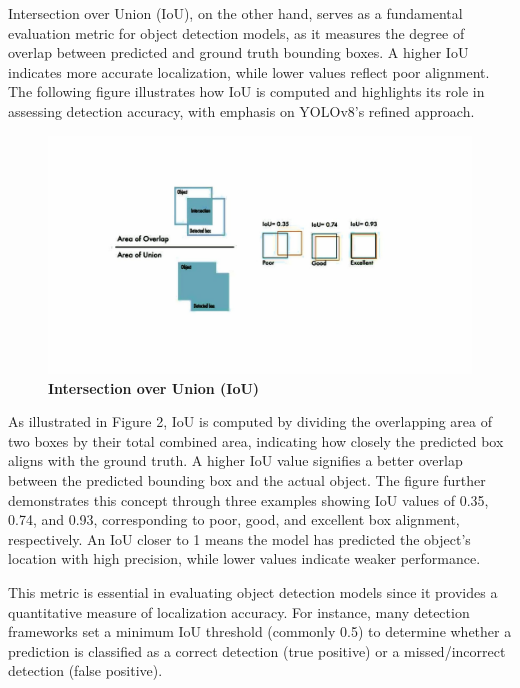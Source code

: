 \begin{refsection}
Intersection over Union (IoU), on the other hand, serves as a fundamental evaluation metric for object detection models, as it measures the degree of overlap between predicted and ground truth bounding boxes. A higher IoU indicates more accurate localization, while lower values reflect poor alignment. The following figure illustrates how IoU is computed and highlights its role in assessing detection accuracy, with emphasis on YOLOv8’s refined approach.


\begin{figure}[H]
    \centering
    \includegraphics[width=1\textwidth]{figures/Fig 2.jpg}
    \caption{\textbf{Intersection over Union (IoU)}}
    \label{figures/Fig 2.jpg}
\end{figure}


As illustrated in Figure 2, IoU is computed by dividing the overlapping area of two boxes by their total combined area, indicating how closely the predicted box aligns with the ground truth. A higher IoU value signifies a better overlap between the predicted bounding box and the actual object. The figure further demonstrates this concept through three examples showing IoU values of 0.35, 0.74, and 0.93, corresponding to poor, good, and excellent box alignment, respectively. An IoU closer to 1 means the model has predicted the object’s location with high precision, while lower values indicate weaker performance. \cite{Terven2023}

This metric is essential in evaluating object detection models since it provides a quantitative measure of localization accuracy. For instance, many detection frameworks set a minimum IoU threshold (commonly 0.5) to determine whether a prediction is classified as a correct detection (true positive) or a missed/incorrect detection (false positive).





\end{refsection}
